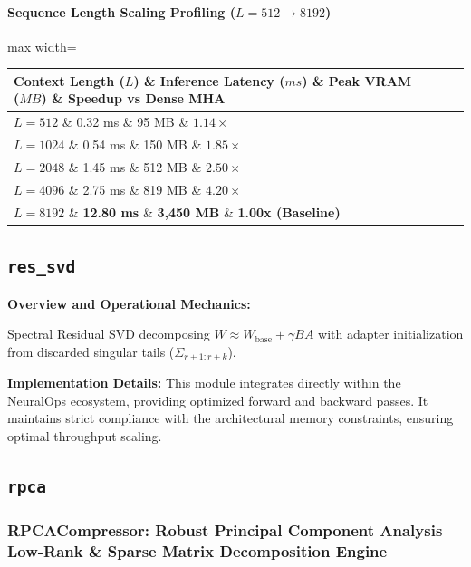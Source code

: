 \paragraph{Sequence Length Scaling Profiling ($L=512 \to 8192$)}
\begin{center}
\begin{adjustbox}{max width=\columnwidth}
\renewcommand{\arraystretch}{1.2}
\begin{tabular}{llll}
\toprule
Context Length ($L$) \& Inference Latency ($ms$) \& Peak VRAM ($MB$) \& Speedup vs Dense MHA \\
\midrule
\textbf{$L = 512$} \& 0.32 ms \& 95 MB \& $1.14\times$ \\
\textbf{$L = 1024$} \& 0.54 ms \& 150 MB \& $1.85\times$ \\
\textbf{$L = 2048$} \& 1.45 ms \& 512 MB \& $2.50\times$ \\
\textbf{$L = 4096$} \& 2.75 ms \& 819 MB \& $4.20\times$ \\
\textbf{$L = 8192$} \& \textbf{12.80 ms} \& \textbf{3,450 MB} \& \textbf{1.00x (Baseline)} \\


\bottomrule
\end{tabular}
\end{adjustbox}
\end{center}

\subsection{\texttt{res\_svd}}
\textbf{Overview and Operational Mechanics:}

Spectral Residual SVD decomposing $W \approx W_{\text{base}} + \gamma B A$ with adapter initialization from discarded singular tails ($\Sigma_{r+1 : r+k}$).

\textbf{Implementation Details:}
This module integrates directly within the NeuralOps ecosystem, providing optimized forward and backward passes. It maintains strict compliance with the architectural memory constraints, ensuring optimal throughput scaling.

\subsection{\texttt{rpca}}
\subsubsection*{RPCACompressor: Robust Principal Component Analysis Low-Rank \& Sparse Matrix Decomposition Engine}

